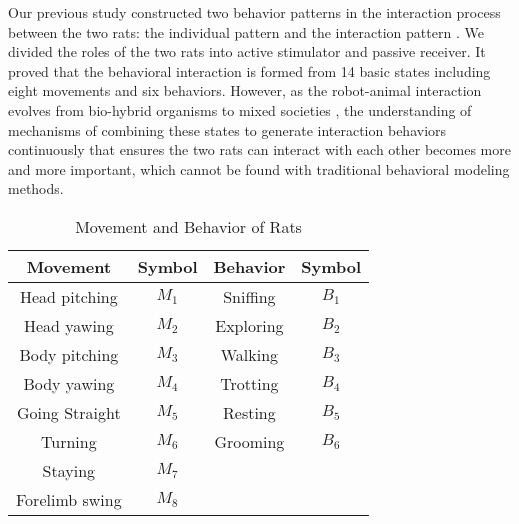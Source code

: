 Our previous study constructed two behavior patterns in the interaction process
between the two rats: the individual pattern and the interaction pattern
\cite{gao-proc}. We divided the roles
of the two rats into active stimulator and passive receiver. It proved that the
behavioral interaction is formed from 14 basic states including eight
movements and six behaviors.
However, as the robot-animal interaction evolves from bio-hybrid organisms to
mixed societies \cite{review-robot-animal-interaction}, the understanding of
mechanisms of combining these states to generate interaction behaviors
continuously that ensures the two rats can interact with each other becomes more
and more important, which cannot be found with traditional behavioral modeling
methods.
\begin{table}[b]
    \caption{Movement and Behavior of Rats}
    \centering
    \begin{tabular}{cccc}
            \hline
            Movement & Symbol & Behavior & Symbol \\
            \hline
            Head pitching & $M_1$ & Sniffing & $B_1$ \\
            Head yawing & $M_2$ & Exploring & $B_2$ \\
            Body pitching & $M_3$ & Walking & $B_3$ \\
            Body yawing & $M_4$ & Trotting & $B_4$ \\
            Going Straight & $M_5$ & Resting & $B_5$ \\
            Turning & $M_6$ & Grooming & $B_6$ \\
            Staying & $M_7$ & & \\
            Forelimb swing & $M_8$ & & \\
            \hline
            \end{tabular}
    \label{table:movement and behavior of rats}
\end{table}

